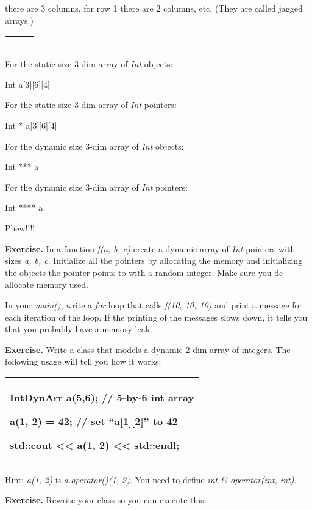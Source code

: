 \documentclass[
]{article}
\begin{document}
there are 3 columns, for row 1 there are 2 columns, etc. (They are
called jagged arrays.)

\begin{longtable}[]{@{}lll@{}}
\toprule
\endhead
& &\tabularnewline
& &\tabularnewline
& &\tabularnewline
\bottomrule
\end{longtable}

For the static size 3-dim array of \emph{Int} objects:

Int a{[}3{]}{[}6{]}{[}4{]}

For the static size 3-dim array of \emph{Int} pointers:

Int * a{[}3{]}{[}6{]}{[}4{]}

For the dynamic size 3-dim array of \emph{Int} objects:

Int *** a

For the dynamic size 3-dim array of \emph{Int} pointers:

Int **** a

Phew!!!!

\textbf{Exercise.} In a function \emph{f(a, b, c)} create a dynamic
array of \emph{Int} pointers with sizes \emph{a, b, c}. Initialize all
the pointers by allocating the memory and initializing the objects the
pointer points to with a random integer. Make sure you de-allocate
memory used.

In your \emph{main()}, write a \emph{for} loop that calls \emph{f(10,
10, 10)} and print a message for each iteration of the loop. If the
printing of the messages slows down, it tells you that you probably have
a memory leak.

\textbf{Exercise. }Write a class that models a dynamic 2-dim array of
integers. The following usage will tell you how it works:

\begin{longtable}[]{@{}l@{}}
\toprule
\endhead
\begin{minipage}[t]{0.97\columnwidth}\raggedright
IntDynArr a(5,6); // 5-by-6 int array

a(1, 2) = 42; // set ``a{[}1{]}{[}2{]}'' to 42

std::cout \textless\textless{} a(1, 2) \textless\textless{}
std::endl;\strut
\end{minipage}\tabularnewline
\bottomrule
\end{longtable}

Hint: \emph{a(1, 2)} is \emph{a.operator()(1, 2)}. You need to define
\emph{int \& operator(int, int)}.

\textbf{Exercise.} Rewrite your class so you can execute this:
\end{document}
